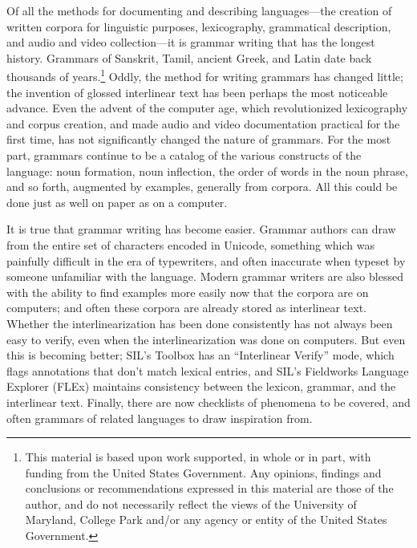Of all the methods for documenting and describing languages---the creation of written corpora for linguistic purposes, lexicography, grammatical description, and audio and video collection---it is grammar writing that has the longest history. Grammars of Sanskrit, Tamil, ancient Greek, and Latin date back thousands of years.\footnote{This
 material is based upon work supported, in whole or in part, with funding from the United States Government. Any opinions, findings and conclusions or recommendations expressed in this material are those of the author, and do not necessarily reflect the views of the University of Maryland, College Park and/or any agency or entity of the United States Government.
} 
Oddly, the method for writing grammars has changed little; the invention of glossed interlinear text has been perhaps the most noticeable advance. Even the advent of the computer age, which revolutionized lexicography and corpus creation, and made audio and video documentation practical for the first time, has not significantly changed the nature of grammars. For the most part, grammars continue to be a catalog of the various constructs of the language: noun formation, noun inflection, the order of words in the noun phrase, and so forth, augmented by examples, generally from corpora.  All this could be done just as well on paper as on a computer.

It is true that grammar writing has become easier. Grammar authors can draw from the entire set of characters encoded in Unicode, something which was painfully difficult in the era of typewriters, and often inaccurate when typeset by someone unfamiliar with the language. Modern grammar writers are also blessed with the ability to find examples more easily now that the corpora are on computers; and often these corpora are already stored as interlinear text. Whether the interlinearization has been done consistently has not always been easy to verify, even when the interlinearization was done on computers. But even this is becoming better; SIL's Toolbox has an ``Interlinear Verify'' mode, which flags annotations that don't match lexical entries, and SIL's Fieldworks Language Explorer (FLEx) maintains consistency between the lexicon, grammar, and the interlinear text. Finally, there are now checklists of phenomena to be covered, and often grammars of related languages to draw inspiration from.

